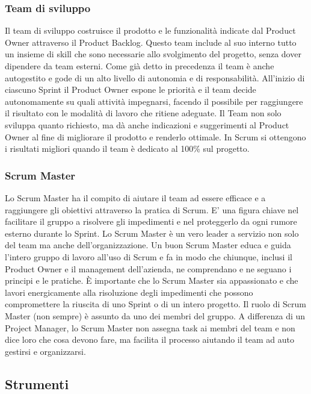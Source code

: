 \documentclass{article}
\begin{document}
\subsubsection{Team di sviluppo}
Il team di sviluppo costruisce il prodotto e le funzionalità indicate dal Product Owner attraverso il Product Backlog. 
Questo team include al suo interno tutto un insieme di skill che sono necessarie allo svolgimento del progetto, senza dover dipendere da team esterni. 
Come già detto in precedenza il team è anche autogestito e gode di un alto livello di autonomia e di responsabilità.
All'inizio di ciascuno Sprint il Product Owner espone le priorità e il team decide autonomamente su quali attività impegnarsi, facendo il possibile 
per raggiungere il risultato con le modalità di lavoro che ritiene adeguate.
Il Team non solo sviluppa quanto richiesto, ma dà anche indicazioni e suggerimenti al Product Owner al fine di migliorare il prodotto e renderlo ottimale.
In Scrum si ottengono i risultati migliori quando il team è dedicato al 100\% sul progetto. 


\subsubsection{Scrum Master}
Lo Scrum Master ha il compito di aiutare il team ad essere efficace e a raggiungere gli obiettivi attraverso la pratica di Scrum. 
E' una figura chiave nel facilitare il gruppo a risolvere gli impedimenti e nel proteggerlo da ogni rumore esterno durante lo Sprint.
Lo Scrum Master è un vero leader a servizio non solo del team ma anche dell'organizzazione.
Un buon Scrum Master educa e guida l'intero gruppo di lavoro all'uso di Scrum e fa in modo che chiunque, inclusi il Product Owner e il management 
dell'azienda, ne comprendano e ne seguano i principi e le pratiche. È importante che lo Scrum Master sia appassionato e che lavori energicamente 
alla risoluzione degli impedimenti che possono compromettere la riuscita di uno Sprint o di un intero progetto.
Il ruolo di Scrum Master (non sempre) è assunto da uno dei membri del gruppo.
A differenza di un Project Manager, lo Scrum Master non assegna task ai membri del team e non dice loro che cosa devono fare, ma facilita il processo 
aiutando il team ad auto gestirsi e organizzarsi.

\newpage
\subsection{Strumenti}
\end{document}
